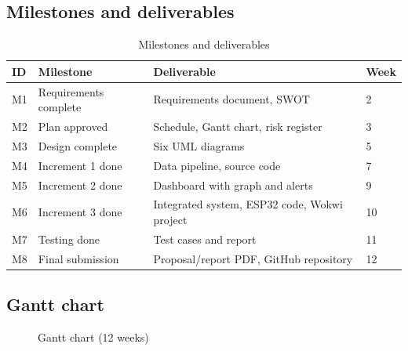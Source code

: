 \documentclass[12pt,a4paper]{article}
\begin{document}
\subsection{Milestones and deliverables}
\begin{table}[H]\centering\small
\begin{tabular}{@{}llp{7.5cm}l@{}}
\toprule \textbf{ID} & \textbf{Milestone} & \textbf{Deliverable} & \textbf{Week}\\\midrule
M1 & Requirements complete & Requirements document, SWOT & 2\\
M2 & Plan approved & Schedule, Gantt chart, risk register & 3\\
M3 & Design complete & Six UML diagrams & 5\\
M4 & Increment 1 done & Data pipeline, source code & 7\\
M5 & Increment 2 done & Dashboard with graph and alerts & 9\\
M6 & Increment 3 done & Integrated system, ESP32 code, Wokwi project & 10\\
M7 & Testing done & Test cases and report & 11\\
M8 & Final submission & Proposal/report PDF, GitHub repository & 12\\\bottomrule
\end{tabular}
\caption{Milestones and deliverables}
\end{table}

\subsection{Gantt chart}
\begin{figure}[H]\centering
{}
\caption{Gantt chart (12 weeks)}
\end{figure}
\end{document}
